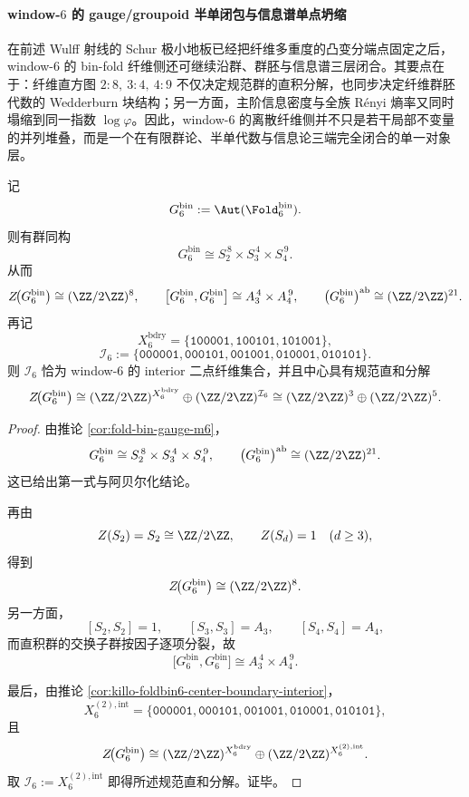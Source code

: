 \paragraph{window-\texorpdfstring{$6$}{6} 的 gauge/groupoid 半单闭包与信息谱单点坍缩}
在前述 Wulff 射线的 Schur 极小地板已经把纤维多重度的凸变分端点固定之后，window-\(6\) 的 bin-fold 纤维侧还可继续沿群、群胚与信息谱三层闭合。其要点在于：纤维直方图 \(2{:}8,\ 3{:}4,\ 4{:}9\) 不仅决定规范群的直积分解，也同步决定纤维群胚代数的 Wedderburn 块结构；另一方面，主阶信息密度与全族 Rényi 熵率又同时塌缩到同一指数 \(\log\varphi\)。因此，window-\(6\) 的离散纤维侧并不只是若干局部不变量的并列堆叠，而是一个在有限群论、半单代数与信息论三端完全闭合的单一对象层。

\begin{theorem}\label{thm:xi-time-part9zf-window6-bingauge-complete-group-dissection}
记
\[
G_6^{\mathrm{bin}}:=\Aut(\Fold_6^{\mathrm{bin}}).
\]
则有群同构
\[
G_6^{\mathrm{bin}}\cong S_2^{\,8}\times S_3^{\,4}\times S_4^{\,9}.
\]
从而
\[
Z\!\bigl(G_6^{\mathrm{bin}}\bigr)\cong (\ZZ/2\ZZ)^8,
\qquad
\bigl[G_6^{\mathrm{bin}},G_6^{\mathrm{bin}}\bigr]\cong A_3^{\,4}\times A_4^{\,9},
\qquad
\bigl(G_6^{\mathrm{bin}}\bigr)^{\mathrm{ab}}\cong (\ZZ/2\ZZ)^{21}.
\]
再记
\[
X_6^{\mathrm{bdry}}=
\{\texttt{100001},\texttt{100101},\texttt{101001}\},
\]
\[
\mathcal I_6:=
\{\texttt{000001},\texttt{000101},\texttt{001001},\texttt{010001},\texttt{010101}\}.
\]
则 \(\mathcal I_6\) 恰为 window-\(6\) 的 interior 二点纤维集合，并且中心具有规范直和分解
\[
Z\!\bigl(G_6^{\mathrm{bin}}\bigr)
\cong
(\ZZ/2\ZZ)^{X_6^{\mathrm{bdry}}}
\oplus
(\ZZ/2\ZZ)^{\mathcal I_6}
\cong
(\ZZ/2\ZZ)^3\oplus(\ZZ/2\ZZ)^5.
\]
\end{theorem}
\begin{proof}
由推论 \ref{cor:fold-bin-gauge-m6}，
\[
G_6^{\mathrm{bin}}\cong S_2^{\,8}\times S_3^{\,4}\times S_4^{\,9},
\qquad
\bigl(G_6^{\mathrm{bin}}\bigr)^{\mathrm{ab}}\cong (\ZZ/2\ZZ)^{21}.
\]
这已给出第一式与阿贝尔化结论。

再由
\[
Z(S_2)=S_2\cong \ZZ/2\ZZ,
\qquad
Z(S_d)=1\quad(d\ge 3),
\]
得到
\[
Z\!\bigl(G_6^{\mathrm{bin}}\bigr)\cong (\ZZ/2\ZZ)^8.
\]
另一方面，
\[
[S_2,S_2]=1,
\qquad
[S_3,S_3]=A_3,
\qquad
[S_4,S_4]=A_4,
\]
而直积群的交换子群按因子逐项分裂，故
\[
\bigl[G_6^{\mathrm{bin}},G_6^{\mathrm{bin}}\bigr]
\cong
A_3^{\,4}\times A_4^{\,9}.
\]

最后，由推论 \ref{cor:killo-foldbin6-center-boundary-interior}，
\[
X_6^{(2),\mathrm{int}}
=
\{\texttt{000001},\texttt{000101},\texttt{001001},\texttt{010001},\texttt{010101}\},
\]
且
\[
Z\!\bigl(G_6^{\mathrm{bin}}\bigr)
\cong
(\ZZ/2\ZZ)^{X_6^{\mathrm{bdry}}}\oplus(\ZZ/2\ZZ)^{X_6^{(2),\mathrm{int}}}.
\]
取 \(\mathcal I_6:=X_6^{(2),\mathrm{int}}\) 即得所述规范直和分解。证毕。
\end{proof}

